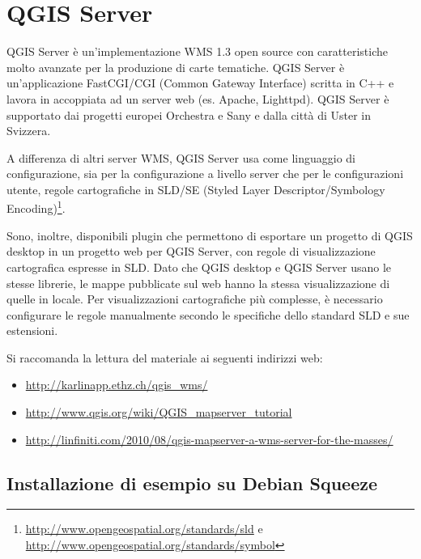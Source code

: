 
\chapter{QGIS Server}\label{label_qgisserver}


QGIS Server è un'implementazione WMS 1.3 open source con caratteristiche
molto avanzate per la produzione di carte tematiche.
QGIS Server è un'applicazione FastCGI/CGI (Common Gateway Interface) scritta 
in C++ e lavora in accoppiata ad un server web (es. Apache, Lighttpd). 
QGIS Server è supportato dai progetti europei Orchestra e Sany e dalla città 
di Uster in Svizzera.

A differenza di altri server WMS, QGIS Server usa come linguaggio di configurazione, 
sia per la configurazione a livello server che per le configurazioni utente, 
regole cartografiche in SLD/SE (Styled Layer Descriptor/Symbology Encoding)\footnote{\url{http://www.opengeospatial.org/standards/sld} e \url{http://www.opengeospatial.org/standards/symbol}}.
 
Sono, inoltre, disponibili plugin che permettono di esportare un progetto di 
QGIS desktop in un progetto web per QGIS Server, con regole di visualizzazione 
cartografica espresse in SLD. Dato che QGIS desktop e QGIS Server usano le stesse librerie, 
le mappe pubblicate sul web hanno la stessa visualizzazione di quelle in locale.
Per visualizzazioni cartografiche più complesse, è necessario configurare le regole
manualmente secondo le specifiche dello standard SLD e sue estensioni.

Si raccomanda la lettura del materiale ai seguenti indirizzi web:

\begin{itemize}
\item \url{http://karlinapp.ethz.ch/qgis\_wms/} \\
\item \url{http://www.qgis.org/wiki/QGIS\_mapserver\_tutorial} \\
\item \url{http://linfiniti.com/2010/08/qgis-mapserver-a-wms-server-for-the-masses/}
\end{itemize}

\section{Installazione di esempio su Debian Squeeze}

